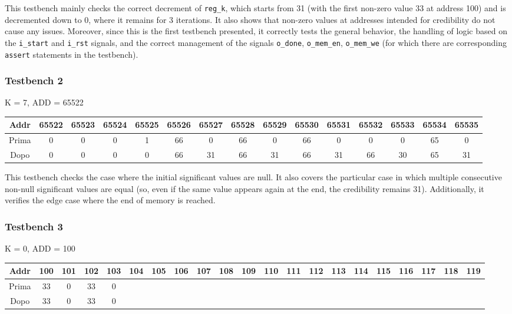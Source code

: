 \documentclass{article}
\begin{document}
This testbench mainly checks the correct decrement of \texttt{reg\_k}, which starts from 31 (with the first non-zero value 33 at address 100) and is decremented down to 0, where it remains for 3 iterations. It also shows that non-zero values at addresses intended for credibility do not cause any issues.
Moreover, since this is the first testbench presented, it correctly tests the general behavior, the handling of logic based on the \texttt{i\_start} and \texttt{i\_rst} signals, and the correct management of the signals \texttt{o\_done}, \texttt{o\_mem\_en}, \texttt{o\_mem\_we} (for which there are corresponding \texttt{assert} statements in the testbench).

\subsubsection{Testbench 2}

K = 7, ADD = 65522
\begin{table}[htbp]
    \begin{adjustwidth}{-1.75cm}{}
    \centering
    \begin{tabular}{|c|*{14}{c|}}
        \hline
        Addr & 65522 & 65523 & 65524 & 65525 & 65526 & 65527 & 65528 & 65529 & 65530 & 65531 & 65532 & 65533 & 65534 & 65535 \\
        \hline
        Prima & 0 & 0 & 0 & 1 & 66 & 0 & 66 & 0 & 66 & 0 & 0 & 0 & 65 & 0 \\
        Dopo & 0 & 0 & 0 & 0 & 66 & 31 & 66 & 31 & 66 & 31 & 66 & 30 & 65 & 31 \\
        \hline
    \end{tabular}
    \end{adjustwidth}
\end{table}

This testbench checks the case where the initial significant values are null. It also covers the particular case in which multiple consecutive non-null significant values are equal (so, even if the same value appears again at the end, the credibility remains 31). Additionally, it verifies the edge case where the end of memory is reached.

\subsubsection{Testbench 3}

K = 0, ADD = 100
\begin{table}[H]
    \begin{adjustwidth}{-1.75cm}{}
    \centering
    \begin{tabular}{|c|*{20}{c|}}
        \hline
        Addr & 100 & 101 & 102 & 103 & 104 & 105 & 106 & 107 & 108 & 109 & 110 & 111 & 112 & 113 & 114 & 115 & 116 & 117 & 118 & 119 \\
        \hline
        Prima & 33 & 0 & 33 & 0 & & & & & & & & & & & & & & & & \\
        Dopo & 33 & 0 & 33 & 0 & & & & & & & & & & & & & & & & \\
        \hline
    \end{tabular}
    \end{adjustwidth}
\end{table}
\end{document}
